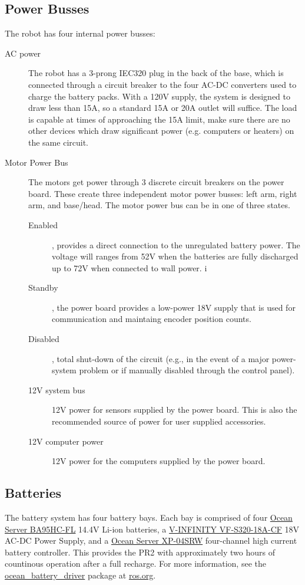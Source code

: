 \subsection{Power Busses}
The robot has four internal power busses:
\begin{description}
\item[AC power] The robot has a 3-prong IEC320 plug in the back of the base, which
  is connected through a circuit breaker to the four AC-DC converters used to
  charge the battery packs.  With a 120V supply, the system is designed to draw less than 15A, so a
  standard 15A or 20A outlet will suffice. The load is capable at times of
  approaching the 15A limit, make sure there are no other devices which draw
  significant power (e.g. computers or heaters) on the same circuit.
\item[Motor Power Bus] The motors get power through 3 discrete circuit breakers
  on the power board.  These create three independent motor power busses: left
  arm, right arm, and base/head.  The motor power bus can be in one of three
  states.
\begin{description}
\item[Enabled], provides a direct connection to the unregulated
  battery power. The voltage will ranges from 52V when the batteries are fully
  discharged up to 72V when connected to wall power.  i
\item[Standby], the power
  board provides a low-power 18V supply that is used for communication and
  maintaing encoder position counts.
\item[Disabled], total shut-down of the
  circuit (e.g., in the event of a major power-system problem or if manually
  disabled through the control panel).
\item[12V system bus] 12V power for sensors supplied by the power board. This is
  also the recommended source of power for user supplied accessories.
\item[12V computer power] 12V power for the computers supplied by the power
  board.
\end{description}
\end{description}
\subsection{Batteries}
The battery system has four battery bays.  Each bay is comprised of four
\href{http://www.oceanserver-store.com/18.html}{Ocean Server BA95HC-FL} 14.4V
Li-ion batteries, a
\href{http://www.v-infinity.com/adtemplate_child.asp?c=710918&p=903285&catky=764537&subcatky1=46887&subcatky2=320934}{V-INFINITY
  VF-S320-18A-CF} 18V AC-DC Power Supply, and a
\href{http://www.oceanserver-store.com/xpmibamamo.html}{Ocean Server XP-04SRW}
four-channel high current battery controller. This provides the PR2 with
approximately two hours of countinous operation after a full recharge.  For more
information, see the \href{http://www.ros.org/wiki/ocean\_battery\_driver}{ocean\_battery\_driver}
package at \href{http://www.ros.org}{ros.org}.

